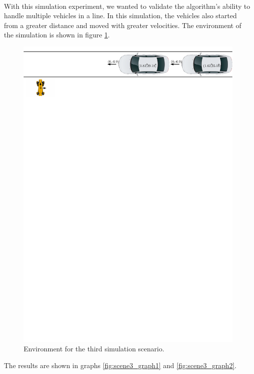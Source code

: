         \\
            With this simulation experiment, we wanted to validate the algorithm's ability to handle multiple vehicles in a line. In this simulation, the vehicles also started from a greater distance and moved with greater velocities. The environment of the simulation is shown in figure \ref{fig:scene3}.\\
            \begin{figure}[H]
                \centering
                \includegraphics[width=0.95\linewidth]{images/simulations/scene3.pdf}
                \caption{Environment for the third simulation scenario.}
                \label{fig:scene3}
            \end{figure}
            The results are shown in graphs \ref{fig:scene3_graph1} and \ref{fig:scene3_graph2}.
